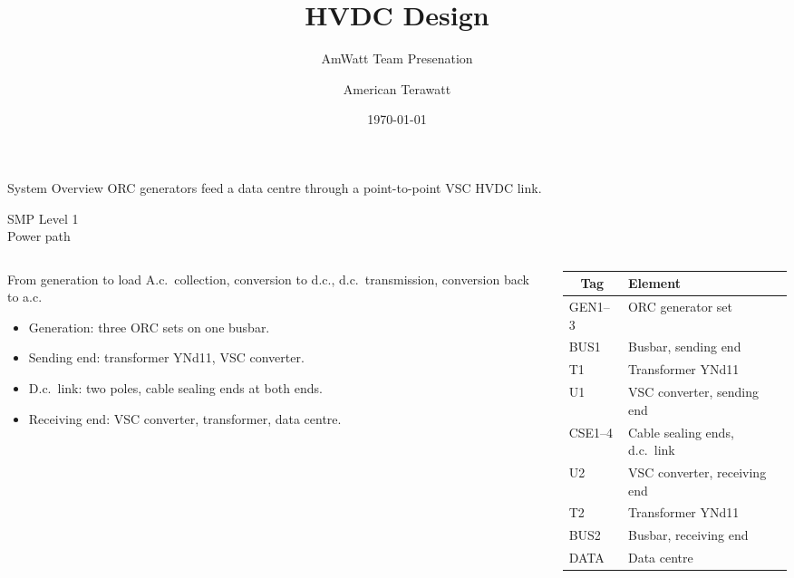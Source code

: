 \documentclass[aspectratio=169,11pt]{beamer}
\title{HVDC Design}
\subtitle{AmWatt Team Presenation}
\author{American Terawatt}
\date{\today}
\newcommand{\slfig}[1]{}
\begin{document}
\titleslide

\begin{frame}{System Overview}
  ORC generators feed a data centre through a point-to-point VSC HVDC link.
  \vspace{2.2em}

  \centering
  \slfig{smp_level_1}
\end{frame}

\begin{frame}{SMP Level 1\\Power path}
  \begin{columns}[T,onlytextwidth]
    \begin{column}{0.50\textwidth}
      \begin{block}{From generation to load}
        A.c.\ collection, conversion to d.c., d.c.\ transmission, conversion back to a.c.
      \end{block}
      \vspace{0.3em}
      \begin{itemize}
        \setlength{\itemsep}{0.4em}
        \item Generation: three ORC sets on one busbar.
        \item Sending end: transformer YNd11, VSC converter.
        \item D.c.\ link: two poles, cable sealing ends at both ends.
        \item Receiving end: VSC converter, transformer, data centre.
      \end{itemize}
    \end{column}
    \begin{column}{0.44\textwidth}
      \footnotesize
      \renewcommand{\arraystretch}{1.1}
      \begin{tabularx}{\linewidth}{@{}l >{\raggedright\arraybackslash}X@{}}
        \toprule
        \multicolumn{1}{c}{\textbf{Tag}} & \textbf{Element} \\
        \midrule
        GEN1--3 & ORC generator set \\
        BUS1    & Busbar, sending end \\
        T1      & Transformer YNd11 \\
        U1      & VSC converter, sending end \\
        CSE1--4 & Cable sealing ends, d.c.\ link \\
        U2      & VSC converter, receiving end \\
        T2      & Transformer YNd11 \\
        BUS2    & Busbar, receiving end \\
        DATA    & Data centre \\
        \bottomrule
      \end{tabularx}
    \end{column}
  \end{columns}
\end{frame}
\end{document}
